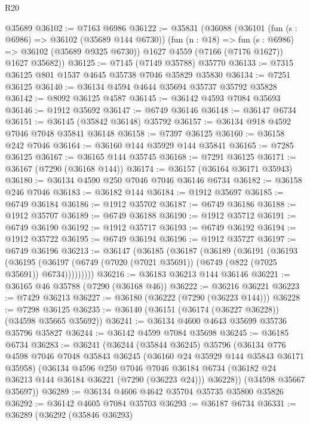 \begin{lexlean}{R20}
\begin{coremodule}
{    @35689
@36102 := @7163 @6986
@36122 := @35831
    (@36088
      (@36101
        (fun (s : @6986) => @36102 (@35689 @144 @6730))
        (fun (n : @18) => fun (s : @6986) => @36102 (@35689 @9325 @6730))
        @1627
        @4559
        (@7166 (@7176 @1627))
        @1627
        @35682))
@36125 := @7145 (@7149 @35788) @35770
@36133 := @7315 @36125 @801 @1537 @4645 @35738 @7046 @35829 @35830
@36134 := @7251 @36125
@36140 := @36134 @4594 @4644 @35694 @35737 @35792 @35828
@36142 := @8092 @36125 @4587
@36145 := @36142 @4593 @7084 @35693
@36146 := @1912 @35692
@36147 := @6749 @36146
@36148 := @36147 @6734
@36151 := @36145 (@35842 @36148) @35792
@36157 := @36134 @918 @4592 @7046 @7048 @35841 @36148
@36158 := @7397 @36125
@36160 := @36158 @242 @7046
@36164 := @36160 @144 @35929 @144 @35841
@36165 := @7285 @36125
@36167 := @36165 @144 @35745
@36168 := @7291 @36125
@36171 := @36167 (@7290 (@36168 @144))
@36174 := @36157 (@36164 @36171 @35943)
@36180 := @36134 @4590 @250 @7046 @7046 @36146 @6734
@36182 := @36158 @246 @7046
@36183 := @36182 @144
@36184 := @1912 @35697
@36185 := @6749 @36184
@36186 := @1912 @35702
@36187 := @6749 @36186
@36188 := @1912 @35707
@36189 := @6749 @36188
@36190 := @1912 @35712
@36191 := @6749 @36190
@36192 := @1912 @35717
@36193 := @6749 @36192
@36194 := @1912 @35722
@36195 := @6749 @36194
@36196 := @1912 @35727
@36197 := @6749 @36196
@36213 := @36147
    (@36185
      (@36187
        (@36189
          (@36191
            (@36193
              (@36195
                (@36197 (@6749 (@7020 (@7021 @35691)) (@6749 (@822 (@7025 @35691)) @6734)))))))))
@36216 := @36183 @36213 @144 @36146
@36221 := @36165 @46 @35788 (@7290 (@36168 @46))
@36222 := @36216 @36221
@36223 := @7429 @36213
@36227 := @36180 (@36222 (@7290 (@36223 @144)))
@36228 := @7298 @36125
@36235 := @36140 (@36151 (@36174 (@36227 @36228)) (@34598 @35665 @35692))
@36241 := @36134 @4600 @4643 @35699 @35736 @35796 @35827
@36244 := @36142 @4599 @7084 @35698
@36245 := @36185 @6734
@36283 := @36241
    (@36244
      (@35844 @36245)
      @35796
      (@36134
        @776
        @4598
        @7046
        @7048
        @35843
        @36245
        (@36160 @24 @35929 @144 @35843 @36171 @35958)
        (@36134
          @4596
          @250
          @7046
          @7046
          @36184
          @6734
          (@36182 @24 @36213 @144 @36184 @36221 (@7290 (@36223 @24)))
          @36228))
      (@34598 @35667 @35697))
@36289 := @36134 @4606 @4642 @35704 @35735 @35800 @35826
@36292 := @36142 @4605 @7084 @35703
@36293 := @36187 @6734
@36331 := @36289
    (@36292
      (@35846 @36293)
}
\end{coremodule}
\end{lexlean}
